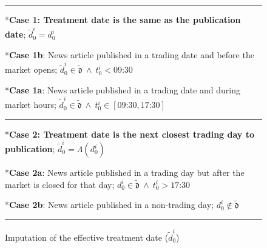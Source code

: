 \begin{figure}[H]
\caption{Imputation of the effective treatment date ($\tilde d_0^i$)}
\label{fig:trading-timelines}


\rule{\linewidth}{0.4pt}
*{\textbf{Case 1: Treatment date is the same as the publication date};  $\tilde d_0^i = d_0^i$}

\begin{minipage}{0.47\textwidth}
\centering
{}*{\textbf{Case 1b}: News article published in a trading date and before the market opens;  $\tilde d_0^i \in \tilde{\mathfrak d} ~\wedge~ t_0^i < \text{09:30}$}

\end{minipage}
\hfill
\begin{minipage}{0.46\textwidth}
\centering
{}*{\textbf{Case 1a}: News article published in a trading date and during market hours;  $\tilde d_0^i \in \tilde{\mathfrak d} ~\wedge~ t_0^i \in [\text{09:30}, \text{17:30}]$}

\end{minipage}

\vspace{0.3cm}
\rule{\linewidth}{0.4pt}

*{\textbf{Case 2: Treatment date is the next closest trading day to publication}; $\tilde d_0^i = \Lambda(d_0^i)$}  

\begin{minipage}{0.48\textwidth}
\centering
{}*{\textbf{Case 2a}: News article published in a trading day but after the market is closed for that day; $d_0^i\in \tilde{\mathfrak d} ~\wedge~ t_0^i>\text{17:30}  $}  

\end{minipage}
\hfill
\begin{minipage}{0.45\textwidth}
\centering
{}*{\textbf{Case 2b}: News article  published in a non-trading day; $d_0^i\not \in \tilde{\mathfrak d}$}  

\end{minipage}

\vspace{0.4cm}
\rule{\linewidth}{0.4pt}

\end{figure}